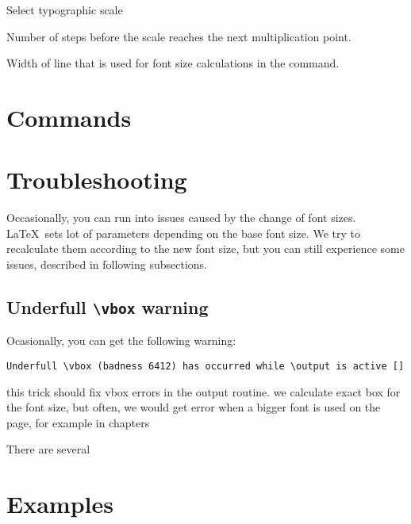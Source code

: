 \documentclass{ltxdoc}
\begin{document}
\noindent {} Select typographic scale

\noindent {} Number of steps before the scale reaches the next multiplication point.

\noindent {} 

\noindent {} 

\noindent {} Width of line that is used for font size calculations in the \cmd{\setsizes} command.




\section{Commands}

\DescribeMacro\setsizes
\cmd\setsizes{}


\section{Troubleshooting}

Occasionally, you can run into issues caused by the change of font sizes. \LaTeX\ sets lot of parameters 
depending on the base font size. We try to recalculate them according to the new font size, but you can still
experience some issues, described in following subsections.

\subsection{Underfull \verb|\vbox| warning}

Ocasionally, you can get the following warning:

\begin{verbatim}
Underfull \vbox (badness 6412) has occurred while \output is active []
\end{verbatim}


this trick should fix vbox errors in the output routine. 
we calculate exact box for the font size, but often,
we would get error when a bigger font is used on the page,
for example in chapters

There are several 
  \def\@textbottom{\vskip \z@ \@plus \resp_font_size \@minus \resp_font_size}
\section{Examples}
\end{document}
